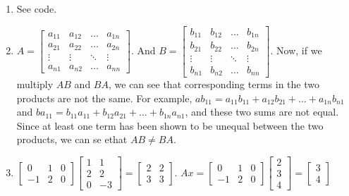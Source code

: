 \documentclass{article}
\begin{document}
\begin{enumerate}
	\item See code. 
	
	\item $A = 
	\begin{bmatrix}
		a_{11}	&a_{12}  	&\dots	&a_{1n}\\
		a_{21} 	&a_{22}	&\dots	&a_{2n}\\
		\vdots	&\vdots	&\ddots	&\vdots\\
		a_{n1}	&a_{n2}	&\dots	&a_{nn}
	\end{bmatrix}
	$. And $B = 
	\begin{bmatrix}
		b_{11}	&b_{12}  	&\dots	&b_{1n}\\
		b_{21} 	&b_{22}	&\dots	&b_{2n}\\
		\vdots	&\vdots	&\ddots	&\vdots\\
		b_{n1}	&b_{n2}	&\dots	&b_{nn}
	\end{bmatrix}
	$. Now, if we multiply $AB$ and $BA$, we can see that corresponding terms in the two products are not the same. For example, $ab_{11} = a_{11}b_{11} + a_{12}b_{21} + \dots + a_{1n}b_{n1}$ and $ba_{11} = b_{11}a_{11} + b_{12}a_{21} + \dots + b_{1n}a_{n1}$, and these two sums are not equal. Since at least one term has been shown to be unequal between the two products, we can se ethat $AB \neq BA$. 
	
	\item $
	\begin{bmatrix}
		0	&1	&0\\
		-1	&2	&0
	\end{bmatrix}
	\begin{bmatrix}
		1	&1\\
		2	&2\\
		0	&-3
	\end{bmatrix}
	= 
	\begin{bmatrix}
		2	&2\\
		3	&3
	\end{bmatrix}
	$. $Ax = 
	\begin{bmatrix}
		0	&1	&0\\
		-1	&2	&0
	\end{bmatrix}
	\begin{bmatrix}
		2\\
		3\\
		4
	\end{bmatrix}
	= 
	\begin{bmatrix}
		3\\
		4
	\end{bmatrix}
	$
	
	\end{enumerate}
\end{document}
